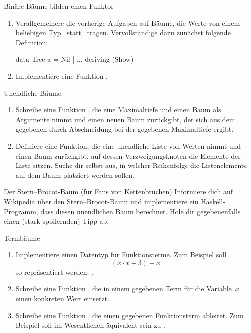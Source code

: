 \documentclass{uebblatt}
\begin{document}
\begin{aufgabe}{Binäre Bäume bilden einen Funktor}
\begin{enumerate}
\item Verallgemeinere die vorherige Aufgaben auf Bäume, die Werte von
einem beliebigen Typ~ statt~ tragen.
Vervollständige dazu zunächst folgende Definition:
\begin{haskellcode}
data Tree a = Nil | ...
    deriving (Show)
\end{haskellcode}
\item Implementiere eine Funktion .
\end{enumerate}
\end{aufgabe}

\begin{aufgabe}{Unendliche Bäume}
\begin{enumerate}
\item Schreibe eine Funktion , die eine
Maximaltiefe und einen Baum als Argumente nimmt und einen neuen Baum
zurückgibt, der sich aus dem gegebenen durch Abschneidung bei der gegebenen
Maximaltiefe ergibt.
\item Definiere eine Funktion, die eine unendliche Liste von Werten nimmt und
einen Baum zurückgibt, auf dessen Verzweigungsknoten die Elemente der Liste
sitzen. Suche dir selbst aus, in welcher Reihenfolge die Listenelemente auf dem
Baum platziert werden sollen.
\end{enumerate}
\end{aufgabe}

\begin{aufgabe}{Der Stern--Brocot-Baum (für Fans von Kettenbrüchen)}
Informiere dich auf Wikipedia über den Stern--Brocot-Baum und implementiere ein
Haskell-Programm, dass diesen unendlichen Baum berechnet. Hole dir
gegebenenfalls einen (stark spoilernden) Tipp ab.
\end{aufgabe}

\begin{aufgabe}{Termbäume}
\begin{enumerate}
\item Implementiere einen Datentyp für Funktionsterme. Zum Beispiel soll
\[ (x \cdot x + 3) - x \]
so repräsentiert werden: .
\item Schreibe eine Funktion ,
die in einem gegebenen Term für die Variable~$x$ einen konkreten Wert einsetzt.
\item Schreibe eine Funktion , die
einen gegebenen Funktionsterm ableitet. Zum Beispiel soll  im Wesentlichen äquivalent sein zu .
\end{enumerate}
\end{aufgabe}
\end{document}
